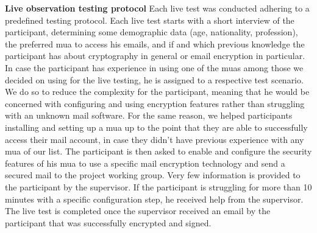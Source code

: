 \newline
\newline
\textbf{Live observation testing protocol}
\newline
Each live test was conducted adhering to a predefined testing protocol. Each live test starts with a short interview of the participant, determining some demographic data (age, nationality, profession), the preferred \acrshort{mua} to access his \acrshort{email}s, and if and which previous knowledge the participant has about cryptography in general or email encryption in particular. In case the participant has experience in using one of the \acrshort{mua}s among those we decided on using for the live testing, he is assigned to a respective test scenario. We do so to reduce the complexity for the participant, meaning that he would be concerned with configuring and using encryption features rather than struggling with an unknown mail software. For the same reason, we helped participants installing and setting up a \acrshort{mua} up to the point that they are able to successfully access their mail account, in case they didn’t have previous experience with any \acrshort{mua} of our list. The participant is then asked to enable and configure the security features of his \acrshort{mua} to use a specific mail encryption technology and send a secured mail to the project working group. Very few information is provided to the participant by the supervisor. If the participant is struggling for more than 10 minutes with a specific configuration step, he received help from the supervisor. The live test is completed once the supervisor received an \acrshort{email} by the participant that was successfully encrypted and signed.